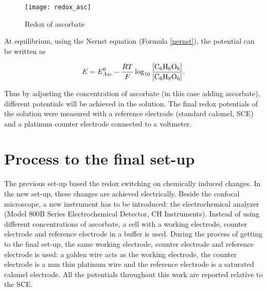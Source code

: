 \documentclass[twoside,single]{lion-msc}
\begin{document}
\begin{figure}[ht!]
\centering
\texttt{[image: redox\_asc]}
\caption{Redox of ascorbate}
\label{redox_asc}
\end{figure}

At equilibrium, using the Nernst equation (Formula \ref{nernst}), the potential can be written as

\begin{equation}
E = E^{0}_{Asc} - \frac{RT}{F} \log_{10} \frac{[\textup{C}_{6}\textup{H}_{6}\textup{O}_{6}]}{[\textup{C}_{6}\textup{H}_{8}\textup{O}_{6}]}.
\end{equation}

Thus by adjusting the concentration of ascorbate (in this case adding ascorbate), different potentials will be achieved in the solution. The final redox potentials of the solution were measured with a reference electrode (standard calomel, SCE) and a platinum counter electrode connected to a voltmeter.

\section{Process to the final set-up}

The previous set-up based the redox switching on chemically induced changes. In the new set-up, these changes are achieved electrically. Beside the confocal microscope, a new instrument has to be introduced: the electrochemical analyzer (Model 800B Series Electrochemical Detector, CH Instruments). Instead of using different concentrations of ascorbate, a cell with a working electrode, counter electrode and reference electrode in a buffer is used. During the process of getting to the final set-up, the same working electrode, counter electrode and reference electrode is used: a  golden wire acts as the working electrode, the counter electrode is a  mm thin platinum wire and the reference electrode is a saturated calomel electrode. All the potentials throughout this work are reported relative to the SCE.
\end{document}
